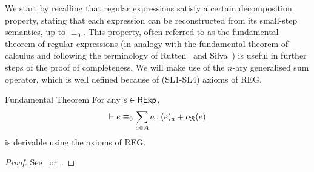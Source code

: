 We start by recalling that regular expressions satisfy a certain decomposition property, stating that each expression can be reconstructed from its small-step semantics, up to $\equiv_0$. This property, often referred to as the fundamental theorem of regular expressions (in analogy with the fundamental theorem of calculus and following the terminology of Rutten~\cite{Rutten:2000:Universal} and Silva~\cite{Silva:2010:Kleene}) is useful in further steps of the proof of completeness. We will make use of the $n$-ary generalised sum operator, which is well defined because of \textsf{(SL1-SL4)} axioms of \textsf{REG}.
\begin{theorem}{Fundamental Theorem}\label{c2:thm:fundamental_theorem}
    For any $e \in \mathsf{RExp}$, $$
    \vdash e \equiv_0 \sum_{a \in {A}} a \mathbin{;} (e)_a + o_{\mathcal{R}}(e)
    $$ is derivable using the axioms of \textsf{REG}.
\end{theorem}
\begin{proof}
	See~\cite[Theorem~4.4]{Brzozowski:1964:Expressions} or~\cite[Lemma~4]{Salomaa:1966:Two}.
\end{proof}
%

